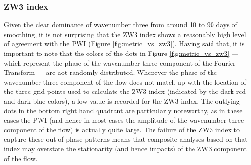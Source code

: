 \subsubsection{ZW3 index}

Given the clear dominance of wavenumber three from around 10 to 90 days of smoothing, it is not surprising that the ZW3 index \citep{Raphael2004} shows a reasonably high level of agreement with the PWI (Figure \ref{fig:metric_vs_zw3}). Having said that, it is important to note that the colors of the dots in Figure \ref{fig:metric_vs_zw3} --- which represent the phase of the wavenumber three component of the Fourier Transform --- are not randomly distributed. Whenever the phase of the wavenumber three component of the flow does not match up with the location of the three grid points used to calculate the ZW3 index (indicated by the dark red and dark blue colors), a low value is recorded for the ZW3 index. The outlying dots in the bottom right hand quadrant are particularly noteworthy, as in these cases the PWI (and hence in most cases the amplitude of the wavenumber three component of the flow) is actually quite large. The failure of the ZW3 index to capture these out of phase patterns means that composite analyses based on that index may overstate the stationarity (and hence impacts) of the ZW3 component of the flow.